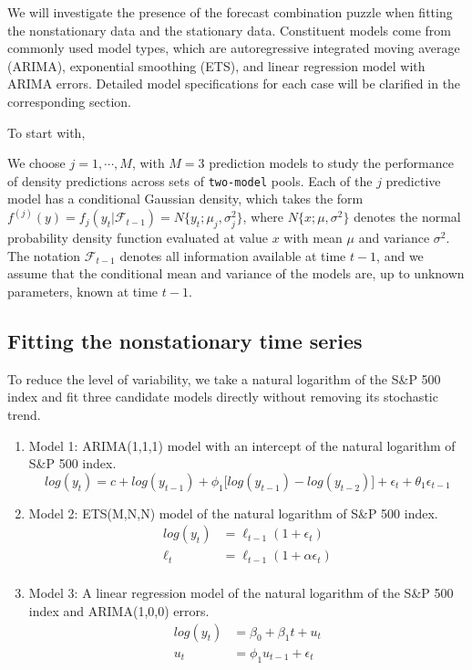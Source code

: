\documentclass{monashthesis}
\begin{document}
We will investigate the presence of the forecast combination puzzle when fitting the nonstationary data and the stationary data. Constituent models come from commonly used model types, which are autoregressive integrated moving average (ARIMA), exponential smoothing (ETS), and linear regression model with ARIMA errors. Detailed model specifications for each case will be clarified in the corresponding section.

To start with,

We choose \(j=1,\cdots,M\), with \(M=3\) prediction models to study the performance of density predictions across sets of \texttt{two-model} pools. Each of the \(j\) predictive model has a conditional Gaussian density, which takes the form \(f^{(j)}(y)=f_j(y_t|\mathcal{F}_{t-1})=N\{y_t; \mu_j, \sigma^2_j\}\), where \(N\{x; \mu, \sigma^2\}\) denotes the normal probability density function evaluated at value \(x\) with mean \(\mu\) and variance \(\sigma^2\). The notation \(\mathcal{F}_{t-1}\) denotes all information available at time \(t-1\), and we assume that the conditional mean and variance of the models are, up to unknown parameters, known at time \(t-1\).

\hypertarget{fitting-the-nonstationary-time-series}{%
\subsection{Fitting the nonstationary time series}\label{fitting-the-nonstationary-time-series}}

To reduce the level of variability, we take a natural logarithm of the S\&P 500 index and fit three candidate models directly without removing its stochastic trend.

\begin{enumerate}
\def\labelenumi{\arabic{enumi}.}
\item
  Model 1: ARIMA(1,1,1) model with an intercept of the natural logarithm of S\&P 500 index.
  \begin{equation*}
  log(y_t) = c + log(y_{t-1}) + \phi_1\big[log(y_{t-1})-log(y_{t-2})\big] + \epsilon_t + \theta_1\epsilon_{t-1}
  \end{equation*}
\item
  Model 2: ETS(M,N,N) model of the natural logarithm of S\&P 500 index.
  \begin{align*}
  log(y_t) &= \ell_{t-1} (1+\epsilon_t) \\
  \ell_t &= \ell_{t-1} (1+\alpha \epsilon_t) \\
  \end{align*}
\item
  Model 3: A linear regression model of the natural logarithm of the S\&P 500 index and ARIMA(1,0,0) errors.
  \begin{align*}
  log(y_t) &= \beta_0 + \beta_1 t + u_t \\
  u_t &= \phi_1 u_{t-1} + \epsilon_t
  \end{align*}
\end{enumerate}
\end{document}
